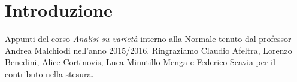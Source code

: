 \chapter{Introduzione}

Appunti del corso \emph{Analisi su varietà} interno alla Normale tenuto dal professor Andrea Malchiodi nell'anno 2015/2016.
Ringraziamo Claudio Afeltra, Lorenzo Benedini, Alice Cortinovis, Luca Minutillo Menga e Federico Scavia per il contributo nella stesura.
